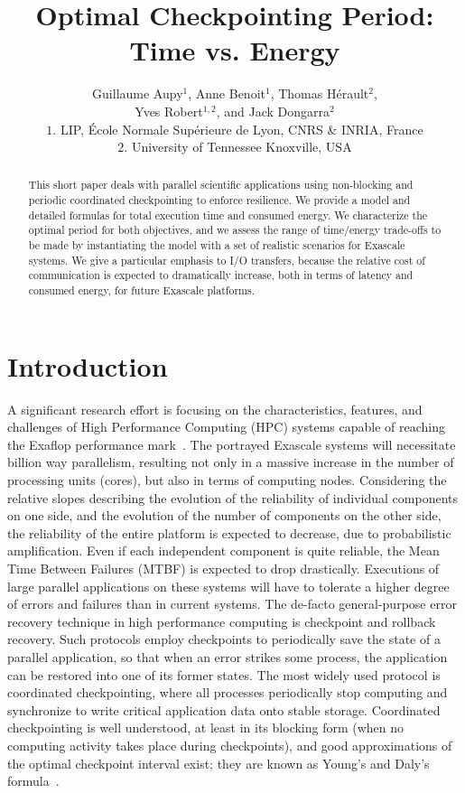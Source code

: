 \documentclass[a4paper]{article}
\author{Guillaume Aupy$^{1}$, Anne Benoit$^{1}$, Thomas H\'erault$^{2}$,\\
 Yves Robert$^{1,2}$, and Jack Dongarra$^{2}$\\
 $1.$ LIP,  \'Ecole Normale Sup\'erieure de Lyon, CNRS \& INRIA, France\\
 $2.$ University of Tennessee Knoxville, USA
}
\title{Optimal Checkpointing Period: Time vs. Energy}
\begin{document}
\maketitle

\begin{abstract}
This short paper deals with parallel scientific applications using non-blocking and periodic coordinated checkpointing
to enforce resilience. We provide a model and detailed formulas for total execution time
and consumed energy. We characterize the optimal period for both objectives, and we assess
the range of time/energy trade-offs to be made by instantiating the model 
with a set of realistic scenarios for Exascale systems. We give a particular emphasis to I/O transfers,
because the relative cost of communication is
expected to dramatically increase, both in terms of latency and consumed energy, for future Exascale platforms.
\end{abstract}


\section{Introduction}
\label{sec.intro}

A significant research effort is focusing on the
characteristics, features, and challenges of High Performance
Computing (HPC) systems capable of reaching the Exaflop performance
mark~\cite{IESP-Exascale,DARPA}. The portrayed Exascale systems will
necessitate billion way parallelism, resulting not only in a massive
increase in the number of processing units (cores), but also in terms
of computing nodes. Considering the relative slopes describing the evolution of the
reliability of individual components on one side, and the evolution of
the number of components on the other side, the reliability of the
entire platform is expected to decrease, due to probabilistic
amplification.  Even if each independent component is quite reliable, the Mean Time Between Failures (MTBF) is expected to drop drastically. Executions of large parallel applications on these
systems will have to tolerate a higher degree of errors and failures
than in current systems. The de-facto general-purpose error recovery technique in high performance computing 
is checkpoint and rollback recovery. Such protocols employ checkpoints to periodically save 
the state of a parallel application, so that when an error strikes some process, 
the application can be restored into one of its former states. The most widely used protocol is coordinated 
checkpointing, where all processes periodically stop computing and synchronize to write critical application
data onto stable
storage. Coordinated 
checkpointing is well understood, at least in its blocking form (when no computing activity takes place
during checkpoints), and good
approximations of the optimal checkpoint interval exist; they are known as
Young's and Daly's formula~\cite{young74,daly04}. 
\end{document}
